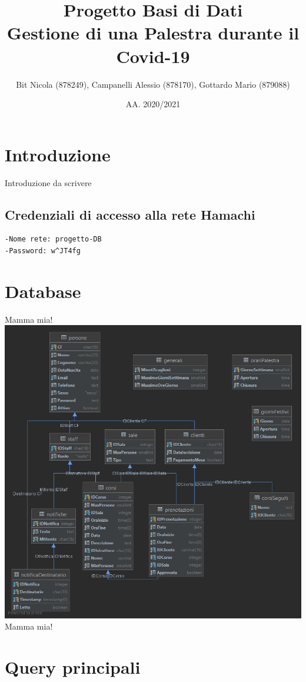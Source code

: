 \documentclass[a4paper,11pt,titlepage]{article}
\title{Progetto Basi di Dati\\Gestione di una Palestra durante il Covid-19}
\author{Bit Nicola (878249), Campanelli Alessio (878170), Gottardo Mario (879088)}
\date{AA. 2020/2021}
\begin{document}
\maketitle
\tableofcontents
\pagebreak
\section{Introduzione}
Introduzione da scrivere
\subsection{Credenziali di accesso alla rete Hamachi}
\begin{verbatim}
-Nome rete: progetto-DB
-Password: w^JT4fg
\end{verbatim}
\section{Database}
Mamma mia!
\\\includegraphics[width=\textwidth]{schema.png}\\
Mamma mia!
\section{Query principali}
\end{document}
